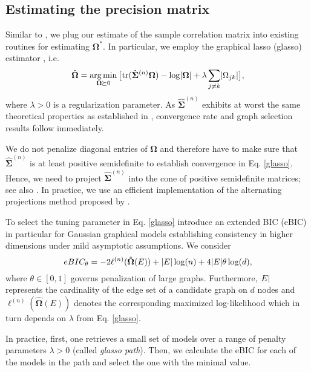 \subsection{Estimating the precision matrix}\label{sec:precision_matrix}

Similar to \citet{Fan17}, we plug our estimate of the sample correlation matrix into existing routines for estimating $\mathbf{\Omega}^*$. In particular, we employ the graphical lasso (glasso) estimator \citep{Friedman08}, i.e.
\begin{equation}\label{glasso}
    \hat{\mathbf\Omega} = \argmin_{\mathbf\Omega \succeq 0} \big[\text{tr}(\hat{\mathbf\Sigma}^{(n)}\mathbf\Omega) - \log\Abs{\mathbf\Omega} + \lambda \sum_{j\neq k}\Abs{\Omega_{jk}}\big],
\end{equation}
where $\lambda > 0$ is a regularization parameter. As $\hat{\mathbf\Sigma}^{(n)}$ exhibits at worst the same theoretical properties as established in %
\citet{Liu09}, convergence rate and graph selection results follow immediately.

We do not penalize diagonal entries of $\mathbf\Omega$ and therefore have to make sure that $\hat{\mathbf\Sigma}^{(n)}$ is at least positive semidefinite to establish convergence in Eq. \eqref{glasso}. Hence, we need to project $\hat{\mathbf\Sigma}^{(n)}$ into the cone of positive semidefinite matrices; see also \citep{Liu12, Fan17}. In practice, we use an efficient implementation of the alternating projections method proposed by \citet{Higham88}.

To select the tuning parameter in Eq. \eqref{glasso}
\citet{Foygel10} introduce an extended BIC (eBIC) in particular for Gaussian graphical models establishing consistency in higher dimensions under mild asymptotic assumptions. We consider
\begin{equation}\label{EBIC}
    eBIC_\theta = -2 \ell^{(n)}(\hat{\mathbf\Omega}(E)) + \Abs{E} \log(n) + 4 \Abs{E}\theta \log(d),
\end{equation}
where $\theta \in [0,1]$ governs penalization of large graphs. Furthermore, $\abs{E}$ represents the cardinality of the edge set of a candidate graph on $d$ nodes and $\ell^{(n)}(\hat{\mathbf\Omega}(E))$ denotes the corresponding maximized log-likelihood \citep[see][for more details]{Foygel10} which in turn depends on $\lambda$ from Eq. \eqref{glasso}.

In practice, first, one retrieves a small set of models over a range of penalty parameters $\lambda > 0$ (called \textit{glasso path}). Then, we calculate the eBIC for each of the models in the path and select the one with the minimal value.

